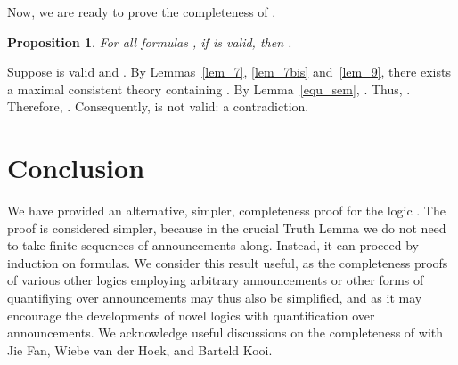 \documentclass{article}[12pt]
\newtheorem{proposition}{Proposition}
\newenvironment{proof}{\noindent {\bf Proof \ }}{\hfill ~}
\begin{document}
\medskip

\noindent Now, we are ready to prove the completeness of .
\begin{proposition}\label{pro_complete}
For all formulas , if  is valid, then .
\end{proposition}
\begin{proof}
Suppose  is valid and .
By Lemmas~\ref{lem_7}, \ref{lem_7bis} and~\ref{lem_9}, there exists a maximal consistent theory  containing .
By Lemma~\ref{equ_sem}, .
Thus, .
Therefore, .
Consequently,  is not valid: a contradiction.
\end{proof}
\section{Conclusion}
We have provided an alternative, simpler, completeness proof for the logic . The proof is considered simpler, because in the crucial Truth Lemma we do not need to take finite sequences of announcements along. Instead, it can proceed by -induction on formulas.
We consider this result useful, as the completeness proofs of various other logics employing arbitrary announcements or other forms of quantifiying over announcements may thus also be simplified, and as it may encourage the developments of novel logics with quantification over announcements. We acknowledge useful discussions on the completeness of  with Jie Fan, Wiebe van der Hoek, and Barteld Kooi.



\end{document}
